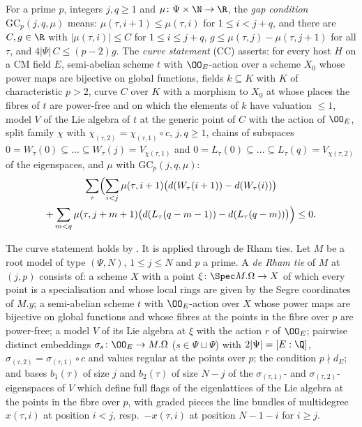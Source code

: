 \begin{definition}\label{pf:towergeo:def-curve}
For a prime $p$, integers $j,q\ge1$ and $\mu\colon\Psi\times\N\to\R$, the \emph{gap condition} $\mathrm{GC}_p(j,q,\mu)$
means: $\mu(\tau,i+1)\le\mu(\tau,i)$ for $1\le i<j+q$, and there are $C,g\in\R$ with $|\mu(\tau,i)|\le C$ for
$1\le i\le j+q$, $g\le\mu(\tau,j)-\mu(\tau,j+1)$ for all $\tau$, and $4|\Psi|\,C\le(p-2)g$. The \emph{curve
statement} \textup{(CC)} asserts: for every host $H$ on a CM field $E$, semi-abelian scheme $t$ with
$\OO_E$-action over a scheme $X_0$ whose power maps are bijective on global functions, fields $k\subseteq K$ with
$K$ of characteristic $p>2$, curve $C$ over $K$ with a morphism to $X_0$ at whose places the fibres of $t$ are
power-free and on which the elements of $k$ have valuation $\le1$, model $V$ of the Lie algebra of $t$ at the
generic point of $C$ with the action of $\OO_E$, split family $\chi$ with $\chi_{(\tau,2)}=\chi_{(\tau,1)}\circ c$,
$j,q\ge1$, chains of subspaces $0=W_\tau(0)\subseteq\dots\subseteq W_\tau(j)=V_{\chi(\tau,1)}$ and
$0=L_\tau(0)\subseteq\dots\subseteq L_\tau(q)=V_{\chi(\tau,2)}$ of the eigenspaces, and $\mu$ with
$\mathrm{GC}_p(j,q,\mu)$:
\begin{multline}\label{pf:towergeo:eq-curve}
\sum_\tau\Bigl(\sum_{i<j}\mu(\tau,i+1)\bigl(d(W_\tau(i+1))-d(W_\tau(i))\bigr)\\
+\sum_{m<q}\mu(\tau,j+m+1)\bigl(d(L_\tau(q-m-1))-d(L_\tau(q-m))\bigr)\Bigr)\le0.
\end{multline}
\end{definition}

The curve statement holds by . It is applied through de Rham
ties. Let $M$ be a root model of type $(\Psi,N)$, $1\le j\le N$ and $p$ a prime. A \emph{de Rham tie} of $M$ at
$(j,p)$ consists of: a scheme $X$ with a point $\xi\colon\Spec M.\Omega\to X$ of which every point is a
specialisation and whose local rings are given by the Segre coordinates of $M.y$; a semi-abelian scheme $t$ with
$\OO_E$-action over $X$ whose power maps are bijective on global functions and whose fibres at the points in the
fibre over $p$ are power-free; a model $V$ of its Lie algebra at $\xi$ with the action $r$ of $\OO_E$; pairwise
distinct embeddings $\sigma_s\colon\OO_E\to M.\Omega$ ($s\in\Psi\sqcup\Psi$) with $2|\Psi|=[E:\Q]$,
$\sigma_{(\tau,2)}=\sigma_{(\tau,1)}\circ c$ and values regular at the points over $p$; the condition $p\nmid d_E$; and
bases $b_1(\tau)$ of size $j$ and $b_2(\tau)$ of size $N-j$ of the $\sigma_{(\tau,1)}$- and
$\sigma_{(\tau,2)}$-eigenspaces of $V$ which define full flags of the eigenlattices of the Lie algebra at the points
in the fibre over $p$, with graded pieces the line bundles of multidegree $x(\tau,i)$ at position $i<j$, resp.\
$-x(\tau,i)$ at position $N-1-i$ for $i\ge j$.

